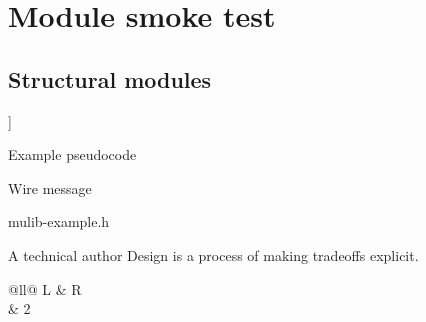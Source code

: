 \documentclass[11pt,oneside,openany,full]{on1x-book}
\begin{document}
\chapter{Module smoke test}
\section{Structural modules}
\begin{OnxGrammar}
\end{OnxGrammar}
\begin{OnxTokens}
\end{OnxTokens}
\begin{OnxAPITable}
\end{OnxAPITable}
\begin{OnxRubric}
\end{OnxRubric}
\begin{OnxPipeline}
\end{OnxPipeline}
\begin{OnxAST}
[Call [fn] [arg]]
\end{OnxAST}
\begin{OnxFlowchart}
\end{OnxFlowchart}
\begin{OnxAlgorithm}{Example pseudocode}
\;
\end{OnxAlgorithm}
\begin{OnxProtocol}{Wire message}
\end{OnxProtocol}
\begin{OnxKernelCard}{mulib-example.h}
\end{OnxKernelCard}
\begin{OnxQuote}{A technical author}
Design is a process of making tradeoffs explicit.
\end{OnxQuote}
\begin{OnxNotationTable}
\end{OnxNotationTable}
\begin{OnxTable}{@{}ll@{}}
L & R\\  & 2\\
\end{OnxTable}
\end{document}
